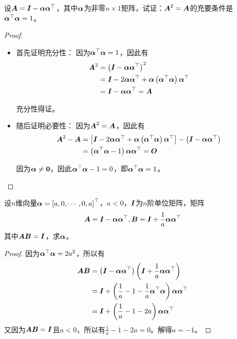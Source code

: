 \begin{problem}\label{problem-1.19}
设\(\mata=\mati-\vecal\vecal^\top\)，其中\(\vecal\)为非零\(n\times1\)矩阵，试证：\(\mata^2=\mata\)的充要条件是\(\vecal^\top\vecal=1\)。
\end{problem}
\begin{proof}
    \begin{itemize}
        \item 首先证明充分性：
              因为\(\vecal^\top\vecal=1\)，因此有
              \begin{align*}
                  \mata^2 & =\spar{\mati-\vecal\vecal^\top}^2                                   \\
                          & =\mati-2\vecal\vecal^\top+\vecal\spar{\vecal^\top\vecal}\vecal^\top \\
                          & =\mati-\vecal\vecal^\top=\mata
              \end{align*}

              充分性得证。

        \item 随后证明必要性：
              因为\(\mata^2=\mata\)，因此有
              \begin{align*}
                  \mata^2-\mata & =\mat{\mati-2\vecal\vecal^\top+\vecal\spar{\vecal^\top\vecal}\vecal^\top}-\spar{\mati-\vecal\vecal^\top} \\
                                & =\spar{\vecal^\top\vecal-1}\vecal\vecal^\top=\mato
              \end{align*}

              因为\(\vecal\neq\veczero\)，因此\(\vecal^\top\vecal-1=0\)，即\(\vecal^\top\vecal=1\)。
    \end{itemize}
\end{proof}

\begin{problem}\label{problem-1.20}
设\(n\)维向量\(\vecal=\myvec{a,0,\cdots,0,a}\)，\(a<0\)，\(\mati\)为\(n\)阶单位矩阵，矩阵
\begin{equation*}
    \mata=\mati-\vecal\vecal^\top,\matb=\mati+\frac{1}{a}\vecal\vecal^\top
\end{equation*}
其中\(\mata\matb=\mati\)，求\(\vecal\)。
\end{problem}
\begin{proof}
    因为\(\vecal^\top\vecal=2a^2\)，所以有
    \begin{align*}
        \mata\matb & =\spar{\mati-\vecal\vecal^\top}\spar{\mati+\frac{1}{a}\vecal\vecal^\top}  \\
                   & =\mati+\spar{\frac{1}{a}-1-\frac{1}{a}\vecal^\top\vecal}\vecal\vecal^\top \\
                   & =\mati+\spar{\frac{1}{a}-1-2a}\vecal\vecal^\top
    \end{align*}
    又因为\(\mata\matb=\mati\)且\(a<0\)，所以有\(\frac{1}{a}-1-2a=0\)。解得\(a=-1\)。
\end{proof}

